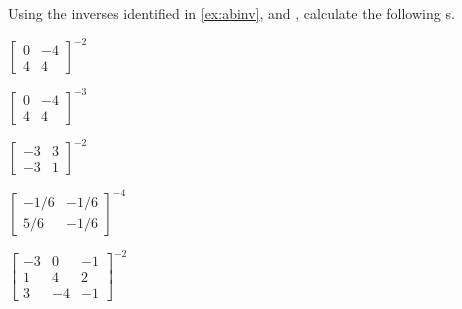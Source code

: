 \begin{exercise}  
Using the inverses identified in \cref{ex:abinv}, and , calculate the following s.
\begin{Parts}
\item \(\begin{bmatrix} 0&-4\\4&4 \end{bmatrix}^{-2}\)

\begin{OmitV1}
\item \(\begin{bmatrix} 0&-4\\4&4 \end{bmatrix}^{-3}\)

\item \(\begin{bmatrix} -3&3
\\-3&1 \end{bmatrix}^{-2}\)
\end{OmitV1}

\item \(\begin{bmatrix} -1/6&-1/6
\\5/6&-1/6 \end{bmatrix}^{-4}\)

\begin{OmitV1}
\item \(\begin{bmatrix} -3&0&-1
\\1&4&2
\\3&-4&-1 \end{bmatrix}^{-2}\)
\end{OmitV1}


\end{Parts}
\end{exercise}
